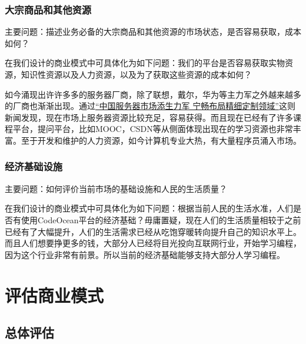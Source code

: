 \documentclass[a4paper]{ctexart}
\begin{document}
\subsubsection{大宗商品和其他资源}
主要问题：描述业务必备的大宗商品和其他资源的市场状态，是否容易获取，成本如何？

在我们设计的商业模式中可具体化为如下问题：我们的平台是否容易获取实物资源，知识性资源以及人力资源，以及为了获取这些资源的成本如何？

如今涌现出许许多多的服务器厂商，除了联想，戴尔，华为等主力军之外越来越多的厂商也渐渐出现。通过\href{http://ent.ifeng.com/c/7vsCxpv6us5}{“中国服务器市场添生力军 宁畅布局精细定制领域”}这则新闻发现，现在市场上服务器资源比较充足，容易获得。而且现在已经有了许多课程平台，提问平台，比如MOOC，CSDN等从侧面体现出现在的学习资源也非常丰富。至于开发和维护的人力资源，如今计算机专业大热，有大量程序员涌入市场。


\subsubsection{经济基础设施}
主要问题：如何评价当前市场的基础设施和人民的生活质量？

在我们设计的商业模式中可具体化为如下问题：根据当前人民的生活水准，人们是否有使用CodeOcean平台的经济基础？毋庸置疑，现在人们的生活质量相较于之前已经有了大幅提升，人们的生活需求已经从吃饱穿暖转向提升自己的知识水平上。而且人们想要挣更多的钱，大部分人已经将目光投向互联网行业，开始学习编程，因为这个行业非常有前景。所以当前的经济基础能够支持大部分人学习编程。

\section{评估商业模式}
\subsection{总体评估}
\end{document}
